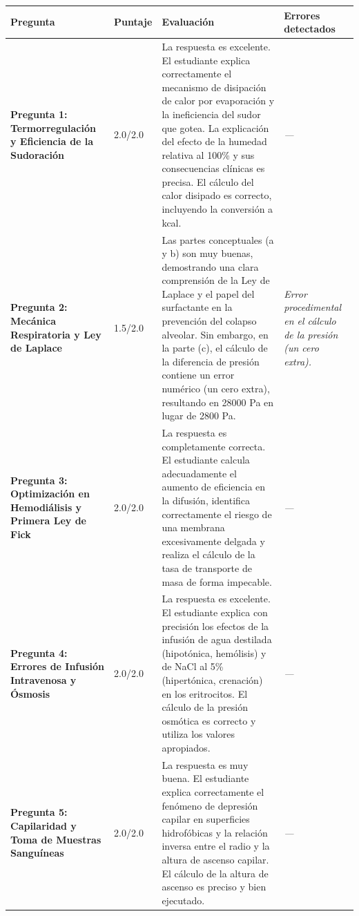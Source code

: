 \documentclass[11pt,a4paper]{article}
\begin{document}
\begin{longtable}{>{\bfseries}p{2.8cm} p{1.6cm} p{7.0cm} p{2.8cm}}
  \toprule
  \textbf{Pregunta} & \textbf{Puntaje} & \textbf{Evaluación} & \textbf{Errores detectados} \\
  \midrule
  \endhead
  \bottomrule
  \endfoot
    \textbf{Pregunta 1: Termorregulación y Eficiencia de la Sudoración} & 2.0/2.0 & La respuesta es excelente. El estudiante explica correctamente el mecanismo de disipación de calor por evaporación y la ineficiencia del sudor que gotea. La explicación del efecto de la humedad relativa al 100\% y sus consecuencias clínicas es precisa. El cálculo del calor disipado es correcto, incluyendo la conversión a kcal. & \textit{---} \\
    \midrule
    \textbf{Pregunta 2: Mecánica Respiratoria y Ley de Laplace} & 1.5/2.0 & Las partes conceptuales (a y b) son muy buenas, demostrando una clara comprensión de la Ley de Laplace y el papel del surfactante en la prevención del colapso alveolar. Sin embargo, en la parte (c), el cálculo de la diferencia de presión contiene un error numérico (un cero extra), resultando en 28000 Pa en lugar de 2800 Pa. & \textit{Error procedimental en el cálculo de la presión (un cero extra).} \\
    \midrule
    \textbf{Pregunta 3: Optimización en Hemodiálisis y Primera Ley de Fick} & 2.0/2.0 & La respuesta es completamente correcta. El estudiante calcula adecuadamente el aumento de eficiencia en la difusión, identifica correctamente el riesgo de una membrana excesivamente delgada y realiza el cálculo de la tasa de transporte de masa de forma impecable. & \textit{---} \\
    \midrule
    \textbf{Pregunta 4: Errores de Infusión Intravenosa y Ósmosis} & 2.0/2.0 & La respuesta es excelente. El estudiante explica con precisión los efectos de la infusión de agua destilada (hipotónica, hemólisis) y de NaCl al 5\% (hipertónica, crenación) en los eritrocitos. El cálculo de la presión osmótica es correcto y utiliza los valores apropiados. & \textit{---} \\
    \midrule
    \textbf{Pregunta 5: Capilaridad y Toma de Muestras Sanguíneas} & 2.0/2.0 & La respuesta es muy buena. El estudiante explica correctamente el fenómeno de depresión capilar en superficies hidrofóbicas y la relación inversa entre el radio y la altura de ascenso capilar. El cálculo de la altura de ascenso es preciso y bien ejecutado. & \textit{---} \\
    \midrule
\end{longtable}
\end{document}
